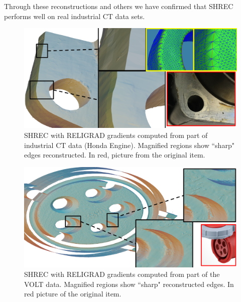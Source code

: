 Through these reconstructions and others we have confirmed that SHREC performs well on real industrial CT data sets. 

\begin{figure}\centering
	\includegraphics[width=\linewidth]{images/ictsetA_2.eps}
	\caption{SHREC with RELIGRAD gradients computed from part of industrial CT data (Honda Engine). Magnified regions show ``sharp" edges reconstructed. In red, picture from the original item.}
	\label{fig:ict:hondaEng}
\end{figure}
\begin{figure}\centering
	\includegraphics[width=\linewidth]{images/volt.eps}
	\caption{SHREC with RELIGRAD gradients computed from part of the VOLT data. Magnified regions show ``sharp" reconstructed edges. In red picture of the original item.}
	\label{fig:ict:volt}
\end{figure}
